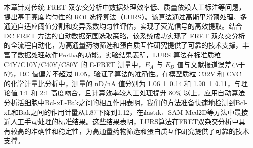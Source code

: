\ifshowtext
本章针对传统 FRET 双杂交分析中数据处理效率低、质量依赖人工标注等问题，提出基于亮度均匀性的 ROI 选择算法（LURS）。该算法通过高斯平滑预处理、多通道自适应阈值分割和变异系数均匀性评估，实现了荧光信号的高效提取。结合 DC-FRET 方法的自动数据范围选取策略，该系统成功实现了 FRET 双杂交分析的全流程自动化，为高通量药物筛选和蛋白质互作研究提供了可靠的技术支撑，丰富了数据处理软件Fretha的功能。实验结果表明，LURS 算法在标准质粒 C4Y/C10Y/C40Y/C80Y 的 E-FRET 测量中，$E_A$ 与 $E_D$ 值与文献报道误差小于 5\%，RC 值偏差不超过 0.05，验证了算法的准确性。在模型质粒 C32V 和 CVC 的化学计量比分析中，测量的 nD/nA 值分别为 1.06 ± 0.14 和 1.90 ± 0.11，与理论值 1:1 和 2:1 高度吻合，且计算效率较人工处理提升 80\% 以上。应用自动算法分析活细胞中Bcl-xL-Bak之间的相互作用表明，我们的方法准备快速地检测到Bcl-xL和Bak之间的作用计量从1.87下降到1.12，在ilastik、SAM-Med2D等方法中最接近人工手动处理的标准结果。这些结果表明，LURS算法在FRET双杂交分析中具有较高的准确性和稳定性，为高通量药物筛选和蛋白质互作研究提供了可靠的技术支撑。
\fi